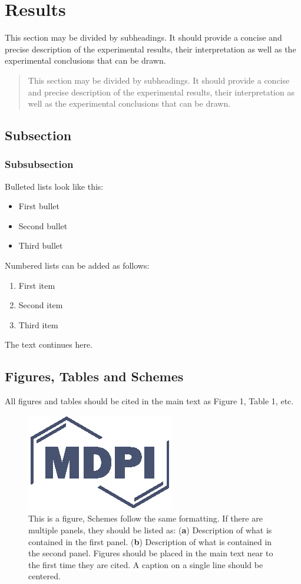 \documentclass[preprints,article,accept,moreauthors,pdftex]{Definitions/mdpi}
\begin{document}
\section{Results}

This section may be divided by subheadings. It should provide a concise and precise description of the experimental results, their interpretation as well as the experimental conclusions that can be drawn.
\begin{quote}
This section may be divided by subheadings. It should provide a concise and precise description of the experimental results, their interpretation as well as the experimental conclusions that can be drawn.
\end{quote}

\subsection{Subsection}
\unskip
\subsubsection{Subsubsection}

Bulleted lists look like this:
\begin{itemize}[leftmargin=*,labelsep=5.8mm]
\item	First bullet
\item	Second bullet
\item	Third bullet
\end{itemize}

Numbered lists can be added as follows:
\begin{enumerate}[leftmargin=*,labelsep=4.9mm]
\item	First item
\item	Second item
\item	Third item
\end{enumerate}

The text continues here.

\subsection{Figures, Tables and Schemes}

All figures and tables should be cited in the main text as Figure 1, Table 1, etc.

\begin{figure}[H]
\centering
\includegraphics[width=2 cm]{Definitions/logo-mdpi}
\caption{This is a figure, Schemes follow the same formatting. If there are multiple panels, they should be listed as: (\textbf{a}) Description of what is contained in the first panel. (\textbf{b}) Description of what is contained in the second panel. Figures should be placed in the main text near to the first time they are cited. A caption on a single line should be centered.}
\end{figure}
\end{document}

